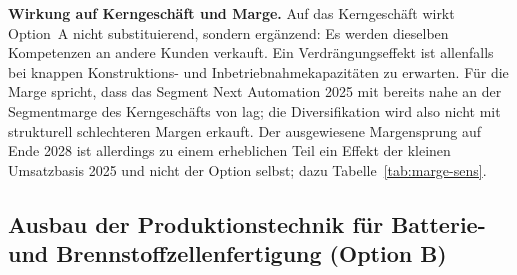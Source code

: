 {\textbf{Wirkung auf Kerngesch\"aft und Marge.} Auf das Kerngesch\"aft wirkt
Option~A nicht substituierend, sondern erg\"anzend: Es werden dieselben
Kompetenzen an andere Kunden verkauft. Ein Verdr\"angungseffekt ist allenfalls
bei knappen Konstruktions- und Inbetriebnahmekapazit\"aten zu erwarten. F\"ur
die Marge spricht, dass das Segment Next Automation 2025 mit
\Pct{\EbitdaMargeNextAutoZFV} bereits nahe an der Segmentmarge des
Kerngesch\"afts von \Pct{\EbitdaMargeEMobilityZFIV} lag; die
Diversifikation wird also nicht mit strukturell schlechteren Margen erkauft.
Der ausgewiesene Margensprung auf \Pct{\MargeZweitausendachtundzwanzigA} Ende
2028 ist allerdings zu einem erheblichen Teil ein Effekt der kleinen
Umsatzbasis 2025 und nicht der Option selbst; dazu
Tabelle~\ref{tab:marge-sens}.}

\subsection{Ausbau der Produktionstechnik f\"ur Batterie- und
Brennstoffzellenfertigung (Option B)}
\label{subsec:option-b}

